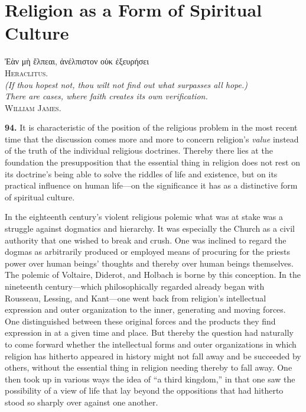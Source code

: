 \documentclass[12pt,a4paper]{book}
\newcommand{\opage}[1]{\marginnote{\footnotesize\textit{[#1]}}}
\begin{document}
\section{Religion as a Form of Spiritual Culture}
\label{sec:spiritual-culture}

\begin{flushright}
\opage{216}
Ἐὰν μὴ ἔλπεαι, ἀνέλπιστον οὐκ ἐξευρήσει\\[2pt]
\textsc{Heraclitus}.\\[2pt]
\textit{(If thou hopest not, thou wilt not find out what surpasses all hope.)}\\[6pt]
\textit{There are cases, where faith creates its own verification.}\\[2pt]
\textsc{William James}.
\end{flushright}

\bigskip

\noindent\textbf{94.} It is characteristic of the position of the religious problem in the most recent time
that the discussion comes more and more to concern religion's \emph{value} instead of the truth of the
individual religious doctrines. Thereby there lies at the foundation the presupposition that the essential
thing in religion does not rest on its doctrine's being able to solve the riddles of life and existence, but
on its practical influence on human life---on the significance it has as a distinctive form of spiritual
culture.

In the eighteenth century's violent religious polemic what was at stake was a struggle against dogmatics and
hierarchy. It was especially the Church as a civil authority that one wished to break and crush. One was
inclined to regard the dogmas as arbitrarily produced or employed means of procuring for the priests power
over human beings' thoughts and thereby over human beings themselves. The polemic of Voltaire, Diderot, and
Holbach is borne by this conception. In the nineteenth century---which philosophically regarded already began
with Rousseau, Lessing, and Kant---one went back from religion's intellectual expression and outer
organization to the inner, generating and moving forces. One distinguished between these original forces and
the products they find expression in at a given time and place. But thereby the question had naturally to come
forward whether the intellectual forms and outer organizations in which religion has hitherto appeared in
history might not fall away and be succeeded by others, without the essential thing in religion needing thereby
to fall away. One then took up in various ways the idea of ``a 
\opage{217}third kingdom,'' in that one saw the possibility
of a view of life that lay beyond the oppositions that had hitherto stood so sharply over against one another.
\end{document}
